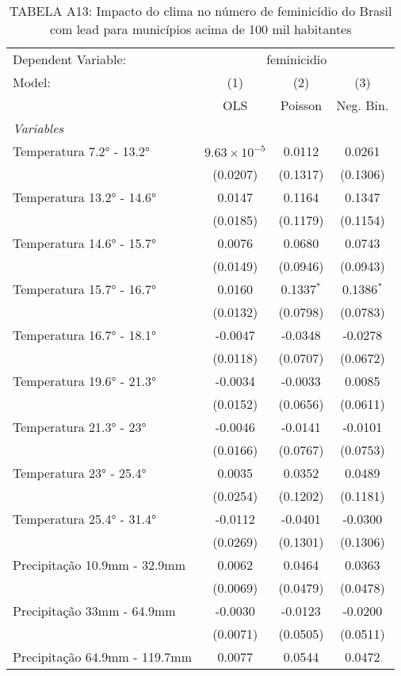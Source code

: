 \documentclass[
]{article}
\begin{document}
\begin{table}[htbp]
\centering
\caption{TABELA A13: Impacto do clima no número de feminicídio do Brasil com lead para municípios acima de 100 mil habitantes}
\begin{tabular}{lccc}
\tabularnewline\midrule\midrule
Dependent Variable:&\multicolumn{3}{c}{feminicidio}\\
Model:&(1) & (2) & (3)\\
 &  OLS & Poisson & Neg. Bin.\\
\midrule \emph{Variables}&   &   &  \\
Temperatura 7.2° - 13.2° & $9.63\times 10^{-5}$ & 0.0112 & 0.0261\\
  &(0.0207) & (0.1317) & (0.1306)\\
Temperatura 13.2° - 14.6° & 0.0147 & 0.1164 & 0.1347\\
  &(0.0185) & (0.1179) & (0.1154)\\
Temperatura 14.6° - 15.7° & 0.0076 & 0.0680 & 0.0743\\
  &(0.0149) & (0.0946) & (0.0943)\\
Temperatura 15.7° - 16.7° & 0.0160 & 0.1337$^{*}$ & 0.1386$^{*}$\\
  &(0.0132) & (0.0798) & (0.0783)\\
Temperatura 16.7° - 18.1° & -0.0047 & -0.0348 & -0.0278\\
  &(0.0118) & (0.0707) & (0.0672)\\
Temperatura 19.6° - 21.3° & -0.0034 & -0.0033 & 0.0085\\
  &(0.0152) & (0.0656) & (0.0611)\\
Temperatura 21.3° - 23° & -0.0046 & -0.0141 & -0.0101\\
  &(0.0166) & (0.0767) & (0.0753)\\
Temperatura 23° - 25.4° & 0.0035 & 0.0352 & 0.0489\\
  &(0.0254) & (0.1202) & (0.1181)\\
Temperatura 25.4° - 31.4° & -0.0112 & -0.0401 & -0.0300\\
  &(0.0269) & (0.1301) & (0.1306)\\
Precipitação 10.9mm - 32.9mm & 0.0062 & 0.0464 & 0.0363\\
  &(0.0069) & (0.0479) & (0.0478)\\
Precipitação 33mm - 64.9mm & -0.0030 & -0.0123 & -0.0200\\
  &(0.0071) & (0.0505) & (0.0511)\\
Precipitação 64.9mm - 119.7mm & 0.0077 & 0.0544 & 0.0472\\

\end{tabular}
\end{table}
\end{document}
